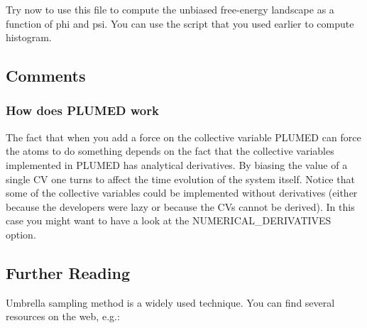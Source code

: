 Try now to use this file to compute the unbiased free-\/energy landscape as a function of phi and psi. You can use the script that you used earlier to compute histogram.\hypertarget{belfast-4_belfast-4-comments}{}\subsection{Comments}\label{belfast-4_belfast-4-comments}
\hypertarget{belfast-4_belfast-4-comments-1}{}\subsubsection{How does P\+L\+U\+M\+E\+D work}\label{belfast-4_belfast-4-comments-1}
The fact that when you add a force on the collective variable P\+L\+U\+M\+E\+D can force the atoms to do something depends on the fact that the collective variables implemented in P\+L\+U\+M\+E\+D has analytical derivatives. By biasing the value of a single C\+V one turns to affect the time evolution of the system itself. Notice that some of the collective variables could be implemented without derivatives (either because the developers were lazy or because the C\+Vs cannot be derived). In this case you might want to have a look at the N\+U\+M\+E\+R\+I\+C\+A\+L\+\_\+\+D\+E\+R\+I\+V\+A\+T\+I\+V\+E\+S option.\hypertarget{belfast-4_belfast-4-further-reading}{}\subsection{Further Reading}\label{belfast-4_belfast-4-further-reading}
Umbrella sampling method is a widely used technique. You can find several resources on the web, e.\+g.\+:


